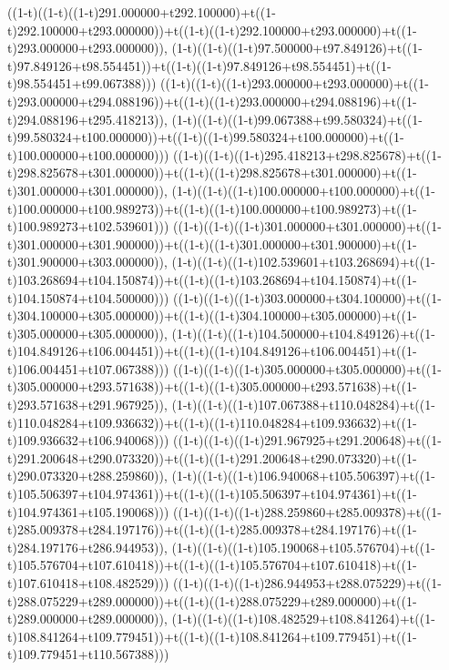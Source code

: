 ((1-t)((1-t)((1-t)291.000000+t292.100000)+t((1-t)292.100000+t293.000000))+t((1-t)((1-t)292.100000+t293.000000)+t((1-t)293.000000+t293.000000)),                                     (1-t)((1-t)((1-t)97.500000+t97.849126)+t((1-t)97.849126+t98.554451))+t((1-t)((1-t)97.849126+t98.554451)+t((1-t)98.554451+t99.067388)))
((1-t)((1-t)((1-t)293.000000+t293.000000)+t((1-t)293.000000+t294.088196))+t((1-t)((1-t)293.000000+t294.088196)+t((1-t)294.088196+t295.418213)),                                     (1-t)((1-t)((1-t)99.067388+t99.580324)+t((1-t)99.580324+t100.000000))+t((1-t)((1-t)99.580324+t100.000000)+t((1-t)100.000000+t100.000000)))
((1-t)((1-t)((1-t)295.418213+t298.825678)+t((1-t)298.825678+t301.000000))+t((1-t)((1-t)298.825678+t301.000000)+t((1-t)301.000000+t301.000000)),                                     (1-t)((1-t)((1-t)100.000000+t100.000000)+t((1-t)100.000000+t100.989273))+t((1-t)((1-t)100.000000+t100.989273)+t((1-t)100.989273+t102.539601)))
((1-t)((1-t)((1-t)301.000000+t301.000000)+t((1-t)301.000000+t301.900000))+t((1-t)((1-t)301.000000+t301.900000)+t((1-t)301.900000+t303.000000)),                                     (1-t)((1-t)((1-t)102.539601+t103.268694)+t((1-t)103.268694+t104.150874))+t((1-t)((1-t)103.268694+t104.150874)+t((1-t)104.150874+t104.500000)))
((1-t)((1-t)((1-t)303.000000+t304.100000)+t((1-t)304.100000+t305.000000))+t((1-t)((1-t)304.100000+t305.000000)+t((1-t)305.000000+t305.000000)),                                     (1-t)((1-t)((1-t)104.500000+t104.849126)+t((1-t)104.849126+t106.004451))+t((1-t)((1-t)104.849126+t106.004451)+t((1-t)106.004451+t107.067388)))
((1-t)((1-t)((1-t)305.000000+t305.000000)+t((1-t)305.000000+t293.571638))+t((1-t)((1-t)305.000000+t293.571638)+t((1-t)293.571638+t291.967925)),                                     (1-t)((1-t)((1-t)107.067388+t110.048284)+t((1-t)110.048284+t109.936632))+t((1-t)((1-t)110.048284+t109.936632)+t((1-t)109.936632+t106.940068)))
((1-t)((1-t)((1-t)291.967925+t291.200648)+t((1-t)291.200648+t290.073320))+t((1-t)((1-t)291.200648+t290.073320)+t((1-t)290.073320+t288.259860)),                                     (1-t)((1-t)((1-t)106.940068+t105.506397)+t((1-t)105.506397+t104.974361))+t((1-t)((1-t)105.506397+t104.974361)+t((1-t)104.974361+t105.190068)))
((1-t)((1-t)((1-t)288.259860+t285.009378)+t((1-t)285.009378+t284.197176))+t((1-t)((1-t)285.009378+t284.197176)+t((1-t)284.197176+t286.944953)),                                     (1-t)((1-t)((1-t)105.190068+t105.576704)+t((1-t)105.576704+t107.610418))+t((1-t)((1-t)105.576704+t107.610418)+t((1-t)107.610418+t108.482529)))
((1-t)((1-t)((1-t)286.944953+t288.075229)+t((1-t)288.075229+t289.000000))+t((1-t)((1-t)288.075229+t289.000000)+t((1-t)289.000000+t289.000000)),                                     (1-t)((1-t)((1-t)108.482529+t108.841264)+t((1-t)108.841264+t109.779451))+t((1-t)((1-t)108.841264+t109.779451)+t((1-t)109.779451+t110.567388)))

